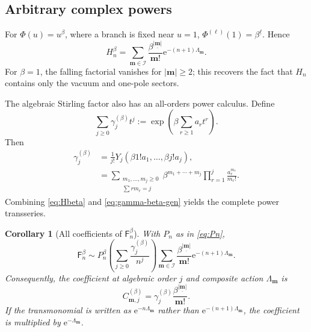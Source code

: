 \documentclass[11pt,a4paper]{article}
\newtheorem{corollary}[theorem]{Corollary}
\theoremstyle{definition}
\theoremstyle{remark}
\newcommand{\Fub}{\mathsf F}
\newcommand{\e}{\mathrm e}
\newcommand{\abs}[1]{\left|#1\right|}
\newcommand{\falling}[2]{#1^{\underline{#2}}}
\begin{document}
\subsection{Arbitrary complex powers}

For \(\Phi(u)=u^\beta\), where a branch is fixed near \(u=1\),
\(
 \Phi^{(\ell)}(1)=\falling{\beta}{\ell}
\).  Hence
\begin{equation}\label{eq:Hbeta}
 H_n^\beta
 =\sum_{\bm m\in\mathcal I}
   \frac{\falling{\beta}{\abs{\bm m}}}{\bm m!}
   \e^{-(n+1)\Lambda_{\bm m}}.
\end{equation}
For \(\beta=1\), the falling factorial vanishes for
\(\abs{\bm m}\ge2\); this recovers the fact that \(H_n\) contains only the
vacuum and one-pole sectors.

The algebraic Stirling factor also has an all-orders power calculus.  Define
\begin{equation}\label{eq:gamma-beta-gen}
 \sum_{j\ge0}\gamma_j^{(\beta)}t^j
 :=\exp\left(\beta\sum_{r\ge1}a_rt^r\right).
\end{equation}
Then
\begin{align}
 \gamma_j^{(\beta)}
 &=\frac1{j!}Y_j(\beta1!a_1,\ldots,\beta j!a_j),
 \label{eq:gamma-beta-bell}\\
 &=\sum_{\substack{m_1,\ldots,m_j\ge0\\\sum rm_r=j}}
   \beta^{m_1+\cdots+m_j}
   \prod_{r=1}^{j}\frac{a_r^{m_r}}{m_r!}.
 \label{eq:gamma-beta-partition}
\end{align}
Combining \eqref{eq:Hbeta} and \eqref{eq:gamma-beta-gen} yields the complete
power transseries.

\begin{corollary}[All coefficients of \(\Fub_n^\beta\)]\label{cor:Fbeta}
With \(P_n\) as in \eqref{eq:Pn},
\begin{equation}\label{eq:Fbeta}
 \Fub_n^\beta\sim P_n^\beta
 \left(\sum_{j\ge0}\frac{\gamma_j^{(\beta)}}{n^j}\right)
 \sum_{\bm m\in\mathcal I}
 \frac{\falling{\beta}{\abs{\bm m}}}{\bm m!}
 \e^{-(n+1)\Lambda_{\bm m}}.
\end{equation}
Consequently, the coefficient at algebraic order \(j\) and composite action
\(\Lambda_{\bm m}\) is
\begin{equation}\label{eq:Fbeta-coeff}
 \boxed{\displaystyle
 C_{\bm m,j}^{(\beta)}
 =\gamma_j^{(\beta)}
  \frac{\falling{\beta}{\abs{\bm m}}}{\bm m!}}.
\end{equation}
If the transmonomial is written as \(\e^{-n\Lambda_{\bm m}}\) rather than
\(\e^{-(n+1)\Lambda_{\bm m}}\), the coefficient is multiplied by
\(\e^{-\Lambda_{\bm m}}\).
\end{corollary}
\end{document}
